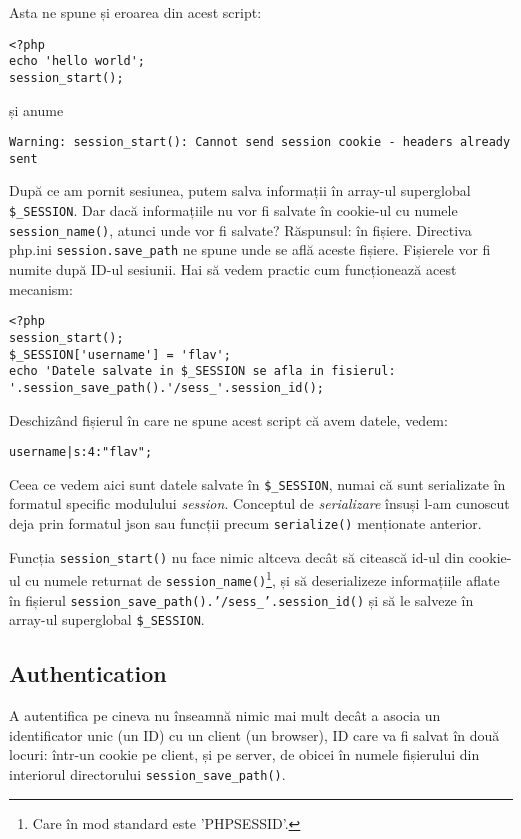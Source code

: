 Asta ne spune și eroarea din acest script:
\begin{lstlisting}[title=Headers already sent]
<?php
echo 'hello world';
session_start();
\end{lstlisting}
și anume
\begin{verbatim}
Warning: session_start(): Cannot send session cookie - headers already sent
\end{verbatim} 

După ce am pornit sesiunea, putem salva informații \^in array-ul superglobal
\texttt{\$\_SESSION}. Dar dacă informațiile nu vor fi salvate \^in cookie-ul
cu numele \texttt{session\_name()}, atunci unde vor fi salvate? Răspunsul:
\^in fișiere. Directiva php.ini \texttt{session.save\_path} ne spune unde se află
aceste fișiere. Fișierele vor fi numite după ID-ul sesiunii. Hai să vedem practic
cum funcționează acest mecanism:
\begin{lstlisting}[title=Understanding Sessions]
<?php
session_start();
$_SESSION['username'] = 'flav';
echo 'Datele salvate in $_SESSION se afla in fisierul: '.session_save_path().'/sess_'.session_id();
\end{lstlisting}

Deschiz\^and fișierul \^in care ne spune acest script că avem datele, vedem:
\begin{verbatim}
username|s:4:"flav";
\end{verbatim}
Ceea ce vedem aici sunt datele salvate \^in \texttt{\$\_SESSION}, numai că
sunt serializate \^in formatul specific modulului \textit{session}. Conceptul
de \textsl{serializare} \^insuși l-am cunoscut deja prin formatul json sau funcții
precum \texttt{serialize()} menționate anterior.

Funcția \texttt{session\_start()} nu face nimic altceva dec\^at să citească id-ul
din cookie-ul cu numele returnat de \texttt{session\_name()}\footnote{Care \^in mod
standard este 'PHPSESSID'.}, și să deserializeze informațiile aflate \^in fișierul
\texttt{session\_save\_path().'/sess\_'.session\_id()}
și să le salveze \^in
array-ul superglobal \texttt{\$\_SESSION}.

\subsection{Authentication}
A autentifica pe cineva nu înseamnă nimic mai mult decât a asocia
un identificator unic (un ID) cu un client (un browser), ID
care va fi salvat în două locuri: într-un cookie pe client, și pe
server, de obicei în numele fișierului din interiorul directorului
\texttt{session\_save\_path()}.

